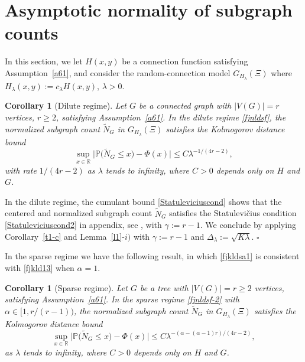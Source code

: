 \documentclass[12pt]{article}
\newtheorem{corollary}[prop]{Corollary}
\def\real{{\mathord{\mathbb R}}}
\def\P{\mathbb{P}}
\newenvironment{Proof}{\removelastskip\par\medskip
\noindent{\em Proof.} \rm}{\penalty-20\null\hfill$\square$\par\medbreak}
\numberwithin{equation}{section}
\begin{document}
\section{Asymptotic normality of subgraph counts}
\label{s6-1}
\noindent
 In this section, we let $H(x,y)$ be a connection function  
  satisfying Assumption~\ref{a61},
  and consider the
  random-connection model $G_{H_\lambda} (\Xi)$
  where $H_\lambda(x,y):= c_\lambda H(x,y)$,
  $\lambda >0$.
\begin{corollary}[Dilute regime]
  \label{c01}
  Let $G$ be a connected graph with $|V(G)|=r$ vertices, $r\geq 2$,
  satisfying Assumption~\ref{a61}. 
  In the dilute regime \eqref{fjnldsf},
  the normalized subgraph count $\widetilde{N}_G$ in 
  $G_{H_\lambda} (\Xi)$ satisfies
  the Kolmogorov distance bound %
\begin{equation}
  \label{fjkld13}
  \sup_{x\in \real}
\big| \P \big( \widetilde{N}_G \leq x \big) - \Phi(x) \big| \leq
C \lambda^{ - 1/(4r - 2)},
\end{equation}
 with rate $1/(4r -2)$ as $\lambda$ tends to infinity, where $C>0$ depends only on $H$ and $G$.
\end{corollary}
\begin{Proof}
   In the dilute regime, the cumulant bound 
 \eqref{Statuleviciuscond} 
 shows that
 the centered and normalized subgraph count
 $\widetilde{N}_G$ 
 satisfies the {Statulevi\v{c}ius condition}
 \eqref{Statuleviciuscond2} in appendix, see \cite{rudzkis,doering},
 with $\gamma := r-1$. 
 We conclude by applying Corollary~\ref{t1-c}
 and Lemma~\ref{l1}-$i)$ with $\gamma :=r-1$
 and $\Delta_\lambda:=\sqrt{K \lambda}$. 
\end{Proof}
In the sparse regime we have the following result, 
 in which \eqref{fjkldsa1} is consistent with
 \eqref{fjkld13} when $\alpha = 1$.
\begin{corollary}[Sparse regime]
  \label{c01-2}
  Let $G$ be a tree with $|V(G)| = r \geq 2$ vertices,
  satisfying Assumption~\ref{a61}. 
  In the sparse regime \eqref{fjnldsf-2}
  with $\alpha \in [1, r/(r-1) )$,
  the normalized subgraph count $\widetilde{N}_G$ in 
  $G_{H_\lambda} (\Xi)$ satisfies
  the Kolmogorov distance bound %
\begin{equation}
\label{fjkldsa1} 
\sup_{x\in \real}
\big| \P \big( \widetilde{N}_G \leq x \big) - \Phi(x) \big| \leq
C \lambda^{ - (
 \alpha   -(\alpha - 1)r 
    ) / ( 4r - 2) }, 
\end{equation} 
 as $\lambda$ tends to infinity, where $C>0$ depends only on $H$ and $G$.
\end{corollary}
\end{document}
